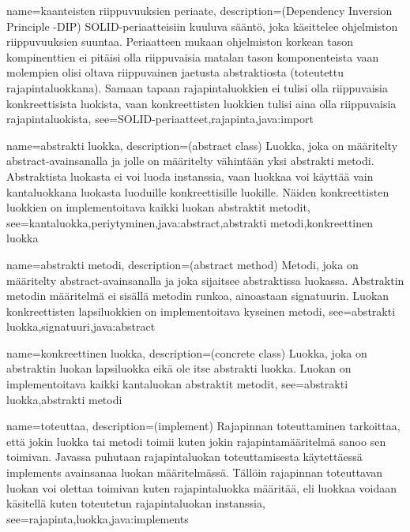{
	name=kaanteisten riippuvuuksien periaate,
	description={(Dependency Inversion Principle -DIP) SOLID-periaatteisiin kuuluva sääntö, joka
käsittelee ohjelmiston riippuvuuksien suuntaa. Periaatteen mukaan ohjelmiston korkean tason
kompinenttien ei pitäisi olla riippuvaisia matalan tason komponenteista vaan molempien olisi
oltava riippuvainen jaetusta abstraktiosta (toteutettu rajapintaluokkana). Samaan tapaan
rajapintaluokkien ei tulisi olla riippuvaisia konkreettisista luokista, vaan konkreettisten 
luokkien tulisi aina olla riippuvaisia rajapintaluokista},
	see={SOLID-periaatteet,rajapinta,java:import}
}

{
	name=abstrakti luokka,
	description={(abstract class) Luokka, joka on määritelty abstract-avainsanalla ja jolle on
määritelty vähintään yksi abstrakti metodi. Abstraktista luokasta ei voi luoda instanssia, vaan
luokkaa voi käyttää vain kantaluokkana luokasta luoduille konkreettisille luokille. Näiden
konkreettisten luokkien on implementoitava kaikki luokan abstraktit metodit},
	see={kantaluokka,periytyminen,java:abstract,abstrakti metodi,konkreettinen luokka}
}

{
	name=abstrakti metodi,
	description={(abstract method) Metodi, joka on määritelty abstract-avainsanalla ja joka
sijaitsee abstraktissa luokassa. Abstraktin metodin määritelmä ei sisällä metodin runkoa,
ainoastaan signatuurin. Luokan konkreettisten lapsiluokkien on implementoitava kyseinen metodi},
	see={abstrakti luokka,signatuuri,java:abstract}
}

{
	name=konkreettinen luokka,
	description={(concrete class) Luokka, joka on abstraktin luokan lapsiluokka eikä ole itse
abstrakti luokka. Luokan on implementoitava kaikki kantaluokan abstraktit metodit},
	see={abstrakti luokka,abstrakti metodi}
}

{
	name=toteuttaa,
	description={(implement) Rajapinnan toteuttaminen tarkoittaa, että jokin luokka tai metodi
toimii kuten jokin rajapintamääritelmä sanoo sen toimivan. Javassa puhutaan rajapintaluokan
toteuttamisesta käytettäessä implements avainsanaa luokan määritelmässä. Tällöin rajapinnan
toteuttavan luokan voi olettaa toimivan kuten rajapintaluokka määritää, eli luokkaa voidaan
käsitellä kuten toteutetun rajapintaluokan instanssia},
	see={rajapinta,luokka,java:implements}
}